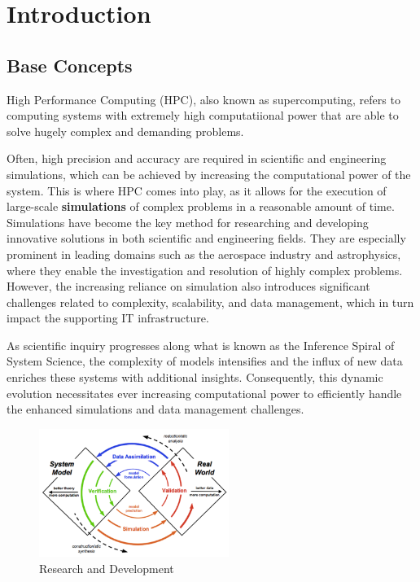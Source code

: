 \chapter{Introduction}

\section{Base Concepts} \label{sec:base_concepts}

High Performance Computing (HPC), also known as supercomputing, refers to computing systems with extremely high computatiional power that are able to solve hugely complex and demanding problems. \cite{europaHighPerformance}

Often, high precision and accuracy are required in scientific and engineering simulations, which can be achieved by increasing the computational power of the system. This is where HPC comes into play, as it allows for the execution of large-scale \textbf{simulations} of complex problems in a reasonable amount of time. Simulations have become the key method for researching and developing innovative solutions in both scientific and engineering fields. They are especially prominent in leading domains such as the aerospace industry and astrophysics, where they enable the investigation and resolution of highly complex problems. However, the increasing reliance on simulation also introduces significant challenges related to complexity, scalability, and data management, which in turn impact the supporting IT infrastructure.

As scientific inquiry progresses along what is known as the Inference Spiral of System Science, the complexity of models intensifies and the influx of new data enriches these systems with additional insights. Consequently, this dynamic evolution necessitates ever increasing computational power to efficiently handle the enhanced simulations and data management challenges.

\begin{figure}[H]
    \centering
    \includegraphics[width=0.55\textwidth]{assets/research.png}
    \caption{Research and Development}
    \label{fig:research}
\end{figure}

